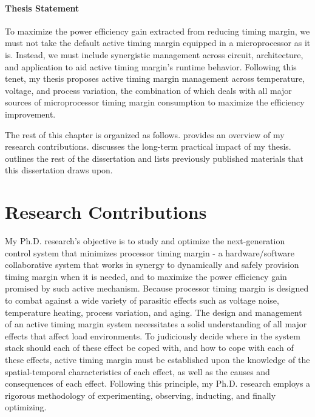 \paragraph{Thesis Statement} To maximize the power efficiency gain extracted from reducing timing margin, we must not take the default active timing margin equipped in a microprocessor as it is. Instead, we must include synergistic management across circuit, architecture, and application to aid active timing margin's runtime behavior. Following this tenet, my thesis proposes active timing margin management across temperature, voltage, and process variation, the combination of which deals with all major sources of microprocessor timing margin consumption to maximize the efficiency improvement.

The rest of this chapter is organized as follows.  provides an overview of my research contributions.  discusses the long-term practical impact of my thesis.  outlines the rest of the dissertation and  lists previously published materials that this dissertation draws upon.

\section{Research Contributions}
\label{sec:intro:work}

My Ph.D. research's objective is to study and optimize the next-generation control system that minimizes processor timing margin - a hardware/software collaborative system that works in synergy to dynamically and safely provision timing margin when it is needed, and to maximize the power efficiency gain promised by such active mechanism. Because processor timing margin is designed to combat against a wide variety of parasitic effects such as voltage noise, temperature heating, process variation, and aging. The design and management of an active timing margin system necessitates a solid understanding of all major effects that affect load environments. To judiciously decide where in the system stack should each of these effect be coped with, and how to cope with each of these effects, active timing margin must be established upon the knowledge of the spatial-temporal characteristics of each effect, as well as the causes and consequences of each effect. Following this principle, my Ph.D. research employs a rigorous methodology of experimenting, observing, inducting, and finally optimizing. 

